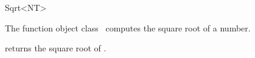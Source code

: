 \begin{ccRefFunctionObjectClass}{Sqrt<NT>}

\ccDefinition

The function object class \ccRefName\ computes the square root of a number.


{returns the square root of .}

\end{ccRefFunctionObjectClass}
